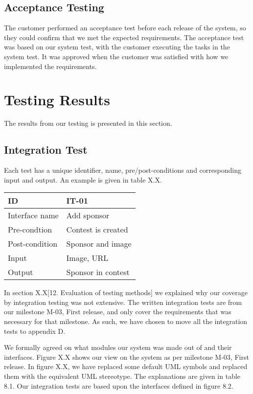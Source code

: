 \subsection{Acceptance Testing}
The customer performed an acceptance test before each release of the
system, so they could confirm that we met the expected requirements.
The acceptance test was based on our system test, with the customer
executing the tasks in the system test. It was
approved when the customer was satisfied with how we implemented the
requirements.

\section{Testing Results}
The results from our testing is presented in this section.

\subsection{Integration Test}
Each test has a unique identifier, name, pre/post-conditions and
corresponding input and output. An example is given in table X.X.


\begin{longtable}{|l|l|}
\hline
ID & IT-01\\\hline
Interface name & Add sponsor\\\hline
Pre-condtion & Contest is created\\\hline
Post-condition & Sponsor and image\\\hline
Input & Image, URL\\\hline
Output & Sponsor in contest\\\hline
\end{longtable}

In section X.X[12. Evaluation of testing methods] we explained why our
coverage by integration testing was not extensive. The written
integration tests are from our milestone M-03, First release, and only cover the
requirements that was necessary for that milestone. As such, we have
chosen to move all the integration tests to appendix D.

We formally agreed on what modules our system was made out of and their
interfaces. Figure X.X shows our view on the system as per milestone
M-03, First release. In figure X.X, we have replaced some default UML symbols and
replaced them with the equivalent UML stereotype. The explanations are
given in table 8.1. Our integration tests are based upon the
interfaces defined in figure 8.2. 

